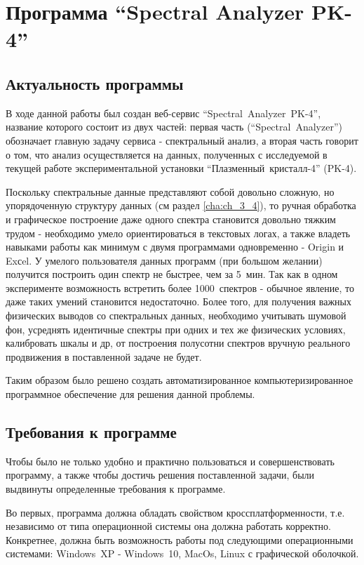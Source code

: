 \chapter{Программа “Spectral Analyzer PK-4”}
\label{cha:ch_4}
\section{Актуальность программы}
В ходе данной работы был создан веб-сервис “Spectral~Analyzer~PK-4”, название которого состоит из двух частей:
первая часть (“Spectral~Analyzer”) обозначает главную задачу сервиса - спектральный анализ, а вторая часть говорит
о том, что анализ осуществляется на данных, полученных с исследуемой в текущей работе экспериментальной установки
“Плазменный~кристалл-4” (PK-4).

Поскольку спектральные данные представляют собой довольно сложную, но упорядоченную структуру данных
(см раздел \ref{cha:ch_3_4}), то ручная обработка и графическое построение даже одного спектра становится
довольно тяжким трудом - необходимо умело ориентироваться в текстовых логах, а также владеть навыками работы
как минимум с двумя программами одновременно - Origin и Exсel. У умелого пользователя данных программ
(при большом желании) получится построить один спектр не быстрее, чем за 5~мин. Так как в одном эксперименте
возможность встретить более 1000~спектров - обычное явление, то даже таких умений становится недостаточно.
Более того, для получения важных физических выводов со спектральных данных, необходимо учитывать шумовой фон,
усреднять идентичные спектры при одних и тех же физических условиях, калибровать шкалы  и др,
от построения полусотни спектров вручную реального продвижения в поставленной задаче не будет.

Таким образом было решено создать автоматизированное компьютеризированное программное обеспечение для решения данной проблемы.

\section{Требования к программе}
Чтобы было не только удобно и практично пользоваться и совершенствовать программу,
а также чтобы достичь решения поставленной задачи, были выдвинуты определенные требования к программе.

Во первых, программа должна обладать свойством кроссплатформенности, т.е. независимо от типа операционной
системы она должна работать корректно. Конкретнее, должна быть возможность работы под следующими операционными
системами: Windows~XP - Windows~10, MacOs, Linux с графической оболочкой.

